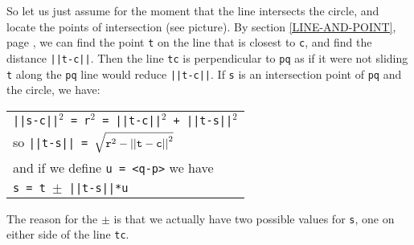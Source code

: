 \documentclass[12pt]{article}
\begin{document}
\begin{minipage}{\textwidth}\raggedright
\label{INTERSECTION-PICTURE}
\begin{wrapfigure}{r}{0.5\textwidth}
\end{wrapfigure}
So let us just assume for the moment that the line intersects
the circle, and locate the points of intersection (see picture).
By section \ref{LINE-AND-POINT}, page \pageref{LINE-AND-POINT},
we can find the point {\tt t} on the line that is closest to
{\tt c}, and find the distance {\tt ||t-c||}.  Then the line {\tt tc} is
perpendicular to {\tt pq} as if it were not sliding {\tt t}
along the {\tt pq} line would reduce {\tt ||t-c||}.
If {\tt s} is an intersection point of {\tt pq} and the circle, we have: \\
\hspace*{0.2in}\begin{tabular}{@{}l}
    {\tt ||s-c||$^2$ = r$^2$ = ||t-c||$^2$ + ||t-s||$^2$} \\
    so {\tt ||t-s|| = $\sqrt{{\tt r}^2 - {\tt ||t-c||}^2}$} \\
    and if we define {\tt u = <q-p>} we have \\
    {\tt s = t $\pm$ ||t-s||*u} \\
    \end{tabular}
\end{minipage}

The reason for the $\pm$ is that we actually have two possible
values for {\tt s}, one on either side of the line {\tt tc}.
\end{document}

